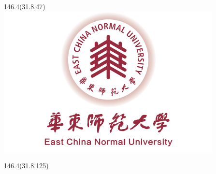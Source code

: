 
\thispagestyle{empty}
\begin{titlepage}
	\captionsetup{belowskip=0pt}
	
	\renewcommand{\ULthickness}{1.2pt}
	\begin{center}\noindent \bfseries {}\end{center}

	\begin{textblock}{146.4}(31.8,47)
		\centering
		\includegraphics{./figures/ecnu_logo.png}
	\end{textblock}

	\begin{textblock}{146.4}(31.8,125)
		\noindent
		\begin{minipage}[t][8.2cm][c]{\linewidth}
			\begin{center}
				\noindent\textbf{\zihao{1}{\rmfamily{\expandafter\uline\expandafter{\Title}}}}
			\end{center}
			\begin{center}
				\noindent\textbf{\zihao{-1}{\rmfamily{\expandafter\uline\expandafter{\TitleSUB}}}}
			\end{center}
		\end{minipage}
	\end{textblock}

	\renewcommand{\ULthickness}{0.4pt}


\end{titlepage}
